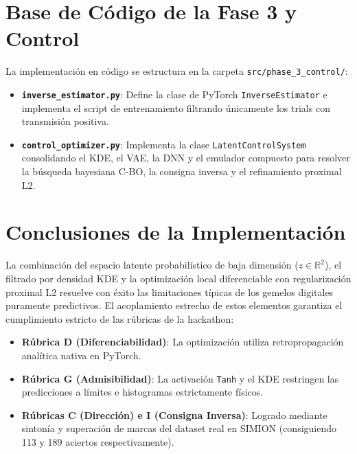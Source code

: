 \documentclass[12pt,letterpaper]{article}
\begin{document}
\section{Base de Código de la Fase 3 y Control}
La implementación en código se estructura en la carpeta \texttt{src/phase\_3\_control/}:
\begin{itemize}
    \item \textbf{\texttt{inverse\_estimator.py}}: Define la clase de PyTorch \texttt{InverseEstimator} e implementa el script de entrenamiento filtrando únicamente los trials con transmisión positiva.
    \item \textbf{\texttt{control\_optimizer.py}}: Implementa la clase \texttt{LatentControlSystem} consolidando el KDE, el VAE, la DNN y el emulador compuesto para resolver la búsqueda bayesiana C-BO, la consigna inversa y el refinamiento proximal L2.
\end{itemize}

\section{Conclusiones de la Implementación}
La combinación del espacio latente probabilístico de baja dimensión ($z \in \mathbb{R}^2$), el filtrado por densidad KDE y la optimización local diferenciable con regularización proximal L2 resuelve con éxito las limitaciones típicas de los gemelos digitales puramente predictivos. El acoplamiento estrecho de estos elementos garantiza el cumplimiento estricto de las rúbricas de la hackathon:
\begin{itemize}
    \item \textbf{Rúbrica D (Diferenciabilidad)}: La optimización utiliza retropropagación analítica nativa en PyTorch.
    \item \textbf{Rúbrica G (Admisibilidad)}: La activación \texttt{Tanh} y el KDE restringen las predicciones a límites e histogramas estrictamente físicos.
    \item \textbf{Rúbricas C (Dirección) e I (Consigna Inversa)}: Logrado mediante sintonía y superación de marcas del dataset real en SIMION (consiguiendo 113 y 189 aciertos respectivamente).
\end{itemize}
\end{document}
